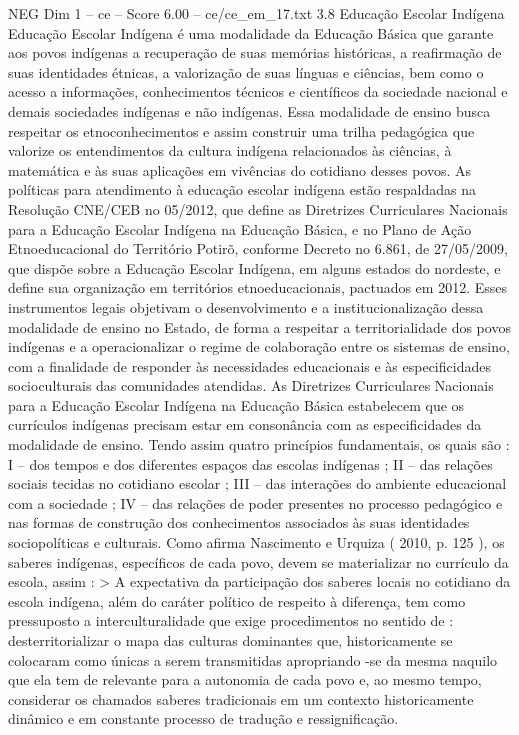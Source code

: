 \begin{textsample}{NEG Dim 1 – ce – Score 6.00 – ce/ce\_em\_17.txt}  \label{ex:f1_neg_248}
3.8 Educação Escolar Indígena Educação Escolar Indígena é uma modalidade da Educação Básica que garante aos povos indígenas a recuperação de suas memórias históricas, a reafirmação de suas identidades étnicas, a valorização de suas línguas e ciências, bem como o acesso a informações, conhecimentos técnicos e científicos da sociedade nacional e demais sociedades indígenas e não indígenas.
Essa modalidade de ensino busca respeitar os etnoconhecimentos e assim construir uma trilha pedagógica que valorize os entendimentos da cultura indígena relacionados às ciências, à matemática e às suas aplicações em vivências do cotidiano desses povos.
As políticas para atendimento à educação escolar indígena estão respaldadas na Resolução CNE/CEB no 05/2012, que define as Diretrizes Curriculares Nacionais para a Educação Escolar Indígena na Educação Básica, e no Plano de Ação Etnoeducacional do Território Potirõ, conforme Decreto no 6.861, de 27/05/2009, que dispõe sobre a Educação Escolar Indígena, em alguns estados do nordeste, e define sua organização em territórios etnoeducacionais, pactuados em 2012.
Esses instrumentos legais objetivam o desenvolvimento e a institucionalização dessa modalidade de ensino no Estado, de forma a respeitar a territorialidade dos povos indígenas e a operacionalizar o regime de colaboração entre os sistemas de ensino, com a finalidade de responder às necessidades educacionais e às especificidades socioculturais das comunidades atendidas.
As Diretrizes Curriculares Nacionais para a Educação Escolar Indígena na Educação Básica estabelecem que os currículos indígenas precisam estar em consonância com as especificidades da modalidade de ensino.
Tendo assim quatro princípios fundamentais, os quais são : I – dos tempos e dos diferentes espaços das escolas indígenas ; II – das relações sociais tecidas no cotidiano escolar ; III – das interações do ambiente educacional com a sociedade ; IV – das relações de poder presentes no processo pedagógico e nas formas de construção dos conhecimentos associados às suas identidades sociopolíticas e culturais.
Como afirma Nascimento e Urquiza ( 2010, p. 125 ), os saberes indígenas, específicos de cada povo, devem se materializar no currículo da escola, assim : > A expectativa da participação dos saberes locais no cotidiano da escola indígena, além do caráter político de respeito à diferença, tem como pressuposto a interculturalidade que exige procedimentos no sentido de : desterritorializar o mapa das culturas dominantes que, historicamente se colocaram como únicas a serem transmitidas apropriando -se da mesma naquilo que ela tem de relevante para a autonomia de cada povo e, ao mesmo tempo, considerar os chamados saberes tradicionais em um contexto historicamente dinâmico e em constante processo de tradução e ressignificação.

\end{textsample}
